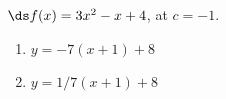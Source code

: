 {$\ds f(x) = 3x^2-x+4$, at $c=-1$.
}
{\begin{enumerate}
\item		$y = -7(x+1)+8$
\item		$y = 1/7(x+1)+8$
\end{enumerate}
}
